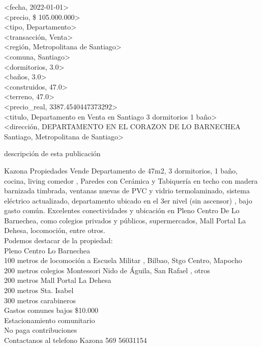 \begin{tcolorbox}[colback=white,colframe=black!50!white,title=Input]
<fecha, 2022-01-01>\\
<precio, \$ 105.000.000>\\
<tipo, Departamento>\\
<transacci\'on, Venta>\\
<regi\'on, Metropolitana de Santiago>\\
<comuna, Santiago>\\
<dormitorios, 3.0>\\
<ba\~nos, 3.0>\\
<construidos, 47.0>\\
<terreno, 47.0>\\
<precio\_real, 3387.4540447373292>\\
<titulo, Departamento en Venta en Santiago 3 dormitorios 1 ba\~no>\\
<direcci\'on, DEPARTAMENTO EN EL CORAZON DE LO BARNECHEA Santiago, Metropolitana de Santiago>
\end{tcolorbox}
\begin{tcolorbox}[colback=white,colframe=black!50!white,title=Tarea]
descripci\'on de esta publicaci\'on
\end{tcolorbox}
\begin{tcolorbox}[colback=white,colframe=black!50!white,title=Respuesta esperada]
\footnotesize
Kazona Propiedades Vende Departamento de 47m2, 3 dormitorios, 1 ba\~no, cocina, living comedor , Paredes con Cer\'amica y Tabiquer\'ia en techo con madera barnizada timbrada, ventanas nuevas de PVC y vidrio termolaminado, sistema el\'ectrico actualizado, departamento ubicado en el 3er nivel (sin ascensor) , bajo gasto com\'un. Excelentes conectividades y ubicaci\'on en Pleno Centro De Lo Barnechea, como colegios privados y p\'ublicos, supermercados, Mall Portal La Dehesa, locomoci\'on, entre otros.\\
Podemos destacar de la propiedad:\\
Pleno Centro Lo Barnechea\\
100 metros de locomoci\'on a Escuela Militar , Bilbao, Stgo Centro, Mapocho\\
200 metros colegios Montessori Nido de \'Aguila, San Rafael , otros\\
200 metros Mall Portal La Dehesa\\
200 metros Sta. Isabel\\
300 metros carabineros\\
Gastos comunes bajos  \$10.000\\
Estacionamiento comunitario\\
No paga contribuciones\\
Contactanos al telefono Kazona 569 56031154
\end{tcolorbox}

